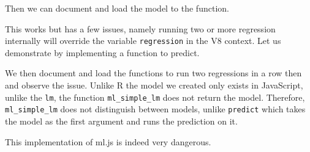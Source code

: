 \documentclass[10pt,]{krantz}
\makeatletter
\newenvironment{Shaded}{\begin{snugshade}}{\end{snugshade}}
\newcommand{\CommentTok}[1]{\textcolor[rgb]{0.37,0.37,0.37}{\textit{#1}}}
\newcommand{\ControlFlowTok}[1]{\textcolor[rgb]{0.27,0.27,0.27}{\textbf{#1}}}
\newcommand{\DecValTok}[1]{\textcolor[rgb]{0.06,0.06,0.06}{#1}}
\newcommand{\KeywordTok}[1]{\textcolor[rgb]{0.27,0.27,0.27}{\textbf{#1}}}
\newcommand{\NormalTok}[1]{#1}
\newcommand{\OperatorTok}[1]{\textcolor[rgb]{0.43,0.43,0.43}{\textbf{#1}}}
\newcommand{\StringTok}[1]{\textcolor[rgb]{0.5,0.5,0.5}{#1}}
\newenvironment{kframe}{%
\medskip{}
\setlength{\fboxsep}{.8em}
 \def\at@end@of@kframe{}%
 \ifinner\ifhmode%
  \def\at@end@of@kframe{\end{minipage}}%
  \begin{minipage}{\columnwidth}%
 \fi\fi%
 \def\FrameCommand##1{\hskip\@totalleftmargin \hskip-\fboxsep
 \colorbox{shadecolor}{##1}\hskip-\fboxsep
     \hskip-\linewidth \hskip-\@totalleftmargin \hskip\columnwidth}%
 \MakeFramed {\advance\hsize-\width
   \@totalleftmargin\z@ \linewidth\hsize
   \@setminipage}}%
 {\par\unskip\endMakeFramed%
 \at@end@of@kframe}
\renewenvironment{Shaded}{\begin{kframe}}{\end{kframe}}
\makeatother
\begin{document}
Then we can document and load the model to the function.

\begin{Shaded}
\end{Shaded}

This works but has a few issues, namely running two or more regression internally will override the variable \texttt{regression} in the V8 context. Let us demonstrate by implementing a function to predict.

\begin{Shaded}
\end{Shaded}

We then document and load the functions to run two regressions in a row then and observe the issue. Unlike R the model we created only exists in JavaScript, unlike the \texttt{lm}, the function \texttt{ml\_simple\_lm} does not return the model. Therefore, \texttt{ml\_simple\_lm} does not distinguish between models, unlike \texttt{predict} which takes the model as the first argument and runs the prediction on it.

This implementation of ml.js is indeed very dangerous.

\begin{Shaded}
\end{Shaded}
\end{document}
